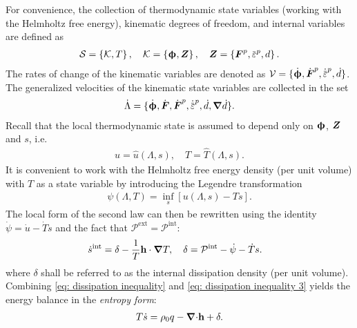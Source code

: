 For convenience, the collection of thermodynamic state variables (working with the Helmholtz free energy), kinematic degrees of freedom, and internal variables are defined as
\begin{align}
  \mathcal{S} = \left\{ \mathcal{K}, T \right\}, \quad \mathcal{K} = \left\{ \bs{\upphi}, \bfZ \right\}, \quad \bfZ = \left\{ \bfF^p, \ep, d \right\}.
\end{align}
The rates of change of the kinematic variables are denoted as $\mathcal{V} = \{ \defrate, \dot{\defgrad}^p, \epdot, \dot{d} \}$. The generalized velocities of the kinematic state variables are collected in the set
\begin{align}
  \dot{\Lambda} = \{ \defrate, \dot{\defgrad}, \dot{\defgrad}^p, \epdot, \dot{d}, \grad \dot{d} \}.
\end{align}
Recall that the local thermodynamic state is assumed to depend only on $\boldsymbol{\upphi}$, $\boldsymbol{Z}$ and $s$, i.e.
\begin{align}
  u = \hat{u}(\Lambda, s), \quad T = \hat{T}(\Lambda, s).
\end{align}
It is convenient to work with the Helmholtz free energy density (per unit volume) with $T$ as a state variable by introducing the Legendre transformation
\begin{align}
  \psi(\Lambda, T) = \inf_s \left[ u(\Lambda, s) - Ts \right].
\end{align}
The local form of the second law can then be rewritten using the identity $\dot{\psi} = \dot{u} - \dot{T}s$ and the fact that $\mathcal{P}^\text{ext} = \mathcal{P}^\text{int}$:
\begin{align}
  \dot{s}^\text{int} & = \delta - \dfrac{1}{T} \textbf{h} \cdot \boldsymbol{\nabla} T,  \quad \delta = \mathcal{P}^\text{int} - \dot{\psi} - \dot{T}s. \label{eq: dissipation inequality 3} 
\end{align}
where $\delta$ shall be referred to as the internal dissipation density (per unit volume). Combining \eqref{eq: dissipation inequality} and \eqref{eq: dissipation inequality 3} yields the energy balance in the \emph{entropy form}:
\begin{align}
  T\dot{s} = \rho_0 q - {\boldsymbol{\nabla} \cdot} \textbf{h} + \delta. \label{eq: energy balance entropy form}
\end{align}

